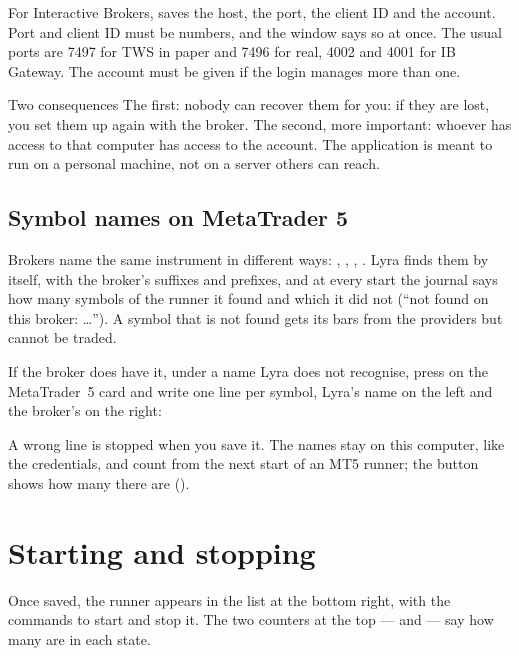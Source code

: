 For Interactive Brokers,  saves the host, the port, the
client ID and the account. Port and client ID must be numbers, and the window
says so at once. The usual ports are \num{7497} for TWS in paper and
\num{7496} for real, \num{4002} and \num{4001} for IB Gateway. The account
must be given if the login manages more than one.

\begin{attenzione}{Two consequences}
The first: nobody can recover them for you: if they are lost, you set them
up again with the broker. The second, more important: whoever has access to
that computer has access to the account. The application is meant to run on
a personal machine, not on a server others can reach.
\end{attenzione}

\subsection{Symbol names on MetaTrader 5}\label{sez:mt5-symbols}

Brokers name the same instrument in different ways: ,
, , . Lyra finds them by itself, with
the broker's suffixes and prefixes, and at every start the journal says how
many symbols of the runner it found and which it did not (\enquote{not found
on this broker: \ldots}). A symbol that is not found gets its bars from the
providers but cannot be traded.

\noindent
If the broker does have it, under a name Lyra does not recognise, press
 on the MetaTrader~5 card and write one line per
symbol, Lyra's name on the left and the broker's on the right:

\begin{center}
\qquad{}
\end{center}

\noindent
A wrong line is stopped when you save it. The names stay on this computer,
like the credentials, and count from the next start of an MT5 runner; the
button shows how many there are ().

\section{Starting and stopping}\label{sez:start-stop}

Once saved, the runner appears in the list at the bottom right, with the
commands to start and stop it. The two counters at the top ---
 and  --- say how many are in each state.

